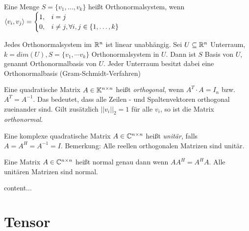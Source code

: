 \begin{definition}[Orthonormalsystem]
	Eine Menge $S = \{ v_1, \dots, v_k \} $ heißt Orthonormalsystem, wenn $\langle v_i, v_j \rangle = \begin{cases}
		1, & i = j \\
		0, & i \neq j, \forall i,j \in \{1, \dots, k\}
	\end{cases}$
\end{definition}

\begin{satz}
	Jedes Orthonormalsystem im $\mathbb{R}^n$ ist linear unabhängig. 
	Sei $U \subseteq \mathbb{R}^n$ Unterraum, $k = dim(U), S = \{v_1,\dotsm v_k\}$ Orthonormalsystem in $U$. Dann ist $S$ Basis von $U$, genannt Orthonormalbasis von $U$. Jeder Unterraum besitzt dabei eine Orthonormalbasis (Gram-Schmidt-Verfahren)
\end{satz}

\begin{definition}
	Eine quadratische Matrix $A \in \mathbb{K}^{n \times n}$ heißt \emph{orthogonal}, wenn $A^T \cdot A = I_n$ bzw. $A^T = A^{-1}$. Das bedeutet, dass alle Zeilen - und Spaltenvektoren orthogonal zueinander sind. Gilt zusätzlich $||v_i||_2 = 1$ für alle $v_i$, so ist die Matrix \emph{orthonormal}.
\end{definition}


\begin{definition}
	Eine komplexe quadratische Matrix $A \in \mathbb{C}^{n \times n}$ heißt \emph{unitär}, falls $A = A^H = A^{-1} = I$. Bemerkung: Alle reellen orthogonalen Matrizen sind unitär.
\end{definition}

\begin{definition}
	Eine Matrix $A \in \mathbb{C}^{n \times n}$ heißt normal genau dann wenn $AA^H = A^HA$. Alle unitären Matrizen sind normal.
\end{definition}

\begin{satz}
	content...
\end{satz}

\pagebreak

\section{Tensor}



